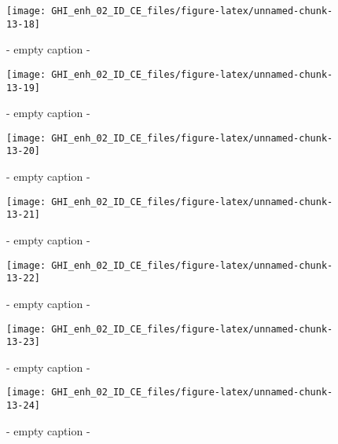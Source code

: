 \documentclass[
  10pt,
  a4paper,oneside]{article}
\begin{document}
\begin{figure}[H]

{\centering \texttt{[image: GHI\_enh\_02\_ID\_CE\_files/figure-latex/unnamed-chunk-13-18]} 

}

\caption{ - empty caption - }\label{fig:unnamed-chunk-13-18}
\end{figure}
\begin{figure}[H]

{\centering \texttt{[image: GHI\_enh\_02\_ID\_CE\_files/figure-latex/unnamed-chunk-13-19]} 

}

\caption{ - empty caption - }\label{fig:unnamed-chunk-13-19}
\end{figure}
\begin{figure}[H]

{\centering \texttt{[image: GHI\_enh\_02\_ID\_CE\_files/figure-latex/unnamed-chunk-13-20]} 

}

\caption{ - empty caption - }\label{fig:unnamed-chunk-13-20}
\end{figure}
\begin{figure}[H]

{\centering \texttt{[image: GHI\_enh\_02\_ID\_CE\_files/figure-latex/unnamed-chunk-13-21]} 

}

\caption{ - empty caption - }\label{fig:unnamed-chunk-13-21}
\end{figure}
\begin{figure}[H]

{\centering \texttt{[image: GHI\_enh\_02\_ID\_CE\_files/figure-latex/unnamed-chunk-13-22]} 

}

\caption{ - empty caption - }\label{fig:unnamed-chunk-13-22}
\end{figure}
\begin{figure}[H]

{\centering \texttt{[image: GHI\_enh\_02\_ID\_CE\_files/figure-latex/unnamed-chunk-13-23]} 

}

\caption{ - empty caption - }\label{fig:unnamed-chunk-13-23}
\end{figure}
\begin{figure}[H]

{\centering \texttt{[image: GHI\_enh\_02\_ID\_CE\_files/figure-latex/unnamed-chunk-13-24]} 

}

\caption{ - empty caption - }\label{fig:unnamed-chunk-13-24}
\end{figure}
\end{document}
